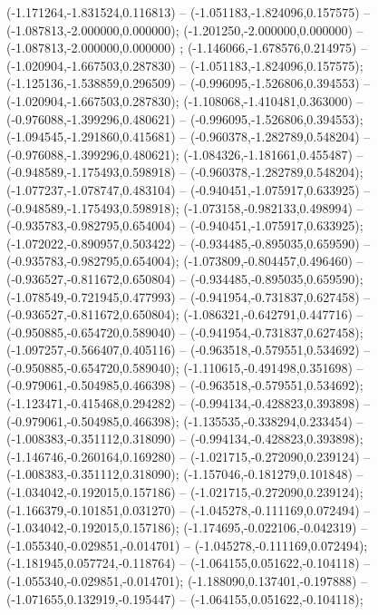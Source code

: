 (-1.171264,-1.831524,0.116813) -- (-1.051183,-1.824096,0.157575) -- (-1.087813,-2.000000,0.000000);
 (-1.201250,-2.000000,0.000000) -- (-1.087813,-2.000000,0.000000) ;
 (-1.146066,-1.678576,0.214975) -- (-1.020904,-1.667503,0.287830) -- (-1.051183,-1.824096,0.157575);
 (-1.125136,-1.538859,0.296509) -- (-0.996095,-1.526806,0.394553) -- (-1.020904,-1.667503,0.287830);
 (-1.108068,-1.410481,0.363000) -- (-0.976088,-1.399296,0.480621) -- (-0.996095,-1.526806,0.394553);
 (-1.094545,-1.291860,0.415681) -- (-0.960378,-1.282789,0.548204) -- (-0.976088,-1.399296,0.480621);
 (-1.084326,-1.181661,0.455487) -- (-0.948589,-1.175493,0.598918) -- (-0.960378,-1.282789,0.548204);
 (-1.077237,-1.078747,0.483104) -- (-0.940451,-1.075917,0.633925) -- (-0.948589,-1.175493,0.598918);
 (-1.073158,-0.982133,0.498994) -- (-0.935783,-0.982795,0.654004) -- (-0.940451,-1.075917,0.633925);
 (-1.072022,-0.890957,0.503422) -- (-0.934485,-0.895035,0.659590) -- (-0.935783,-0.982795,0.654004);
 (-1.073809,-0.804457,0.496460) -- (-0.936527,-0.811672,0.650804) -- (-0.934485,-0.895035,0.659590);
 (-1.078549,-0.721945,0.477993) -- (-0.941954,-0.731837,0.627458) -- (-0.936527,-0.811672,0.650804);
 (-1.086321,-0.642791,0.447716) -- (-0.950885,-0.654720,0.589040) -- (-0.941954,-0.731837,0.627458);
 (-1.097257,-0.566407,0.405116) -- (-0.963518,-0.579551,0.534692) -- (-0.950885,-0.654720,0.589040);
 (-1.110615,-0.491498,0.351698) -- (-0.979061,-0.504985,0.466398) -- (-0.963518,-0.579551,0.534692);
 (-1.123471,-0.415468,0.294282) -- (-0.994134,-0.428823,0.393898) -- (-0.979061,-0.504985,0.466398);
 (-1.135535,-0.338294,0.233454) -- (-1.008383,-0.351112,0.318090) -- (-0.994134,-0.428823,0.393898);
 (-1.146746,-0.260164,0.169280) -- (-1.021715,-0.272090,0.239124) -- (-1.008383,-0.351112,0.318090);
 (-1.157046,-0.181279,0.101848) -- (-1.034042,-0.192015,0.157186) -- (-1.021715,-0.272090,0.239124);
 (-1.166379,-0.101851,0.031270) -- (-1.045278,-0.111169,0.072494) -- (-1.034042,-0.192015,0.157186);
 (-1.174695,-0.022106,-0.042319) -- (-1.055340,-0.029851,-0.014701) -- (-1.045278,-0.111169,0.072494);
 (-1.181945,0.057724,-0.118764) -- (-1.064155,0.051622,-0.104118) -- (-1.055340,-0.029851,-0.014701);
 (-1.188090,0.137401,-0.197888) -- (-1.071655,0.132919,-0.195447) -- (-1.064155,0.051622,-0.104118);
